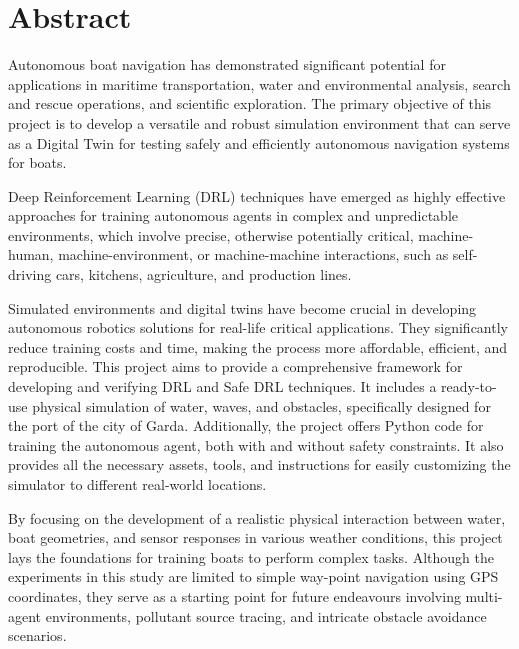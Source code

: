 \section*{Abstract}

\begin{textblock}
Autonomous boat navigation has demonstrated significant potential for applications in maritime transportation, water and environmental analysis, search and rescue operations, and scientific exploration. The primary objective of this project is to develop a versatile and robust simulation environment that can serve as a Digital Twin for testing safely and efficiently autonomous navigation systems for boats. 

Deep Reinforcement Learning (DRL) techniques have emerged as highly effective approaches for training autonomous agents in complex and unpredictable environments, which involve precise, otherwise potentially critical, machine-human, machine-environment, or machine-machine interactions, such as self-driving cars, kitchens, agriculture, and production lines.

Simulated environments and digital twins have become crucial in developing autonomous robotics solutions for real-life critical applications. They significantly reduce training costs and time, making the process more affordable, efficient, and reproducible. This project aims to provide a comprehensive framework for developing and verifying DRL and Safe DRL techniques. It includes a ready-to-use physical simulation of water, waves, and obstacles, specifically designed for the port of the city of Garda. Additionally, the project offers Python code for training the autonomous agent, both with and without safety constraints. It also provides all the necessary assets, tools, and instructions for easily customizing the simulator to different real-world locations.

By focusing on the development of a realistic physical interaction between water, boat geometries, and sensor responses in various weather conditions, this project lays the foundations for training boats to perform complex tasks. Although the experiments in this study are limited to simple way-point navigation using GPS coordinates, they serve as a starting point for future endeavours involving multi-agent environments, pollutant source tracing, and intricate obstacle avoidance scenarios.
\end{textblock}



\blankpage